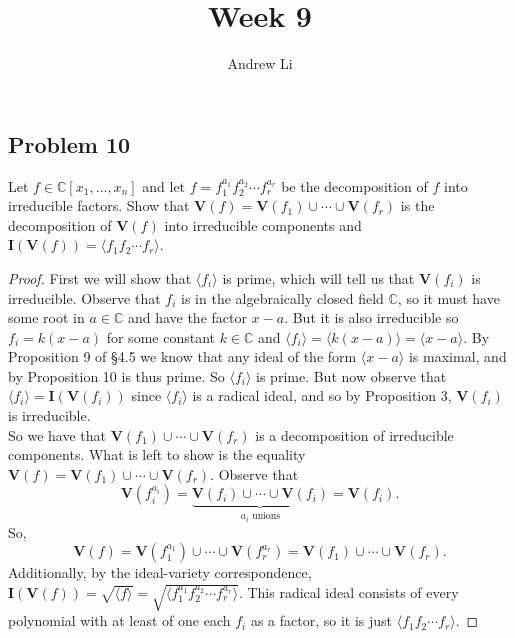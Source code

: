 \documentclass{homework}
\title{Week 9}
\author{Andrew Li}
\newcommand{\cg}[1]{\langle #1 \rangle}
\begin{document}
    \maketitle
    
    \setcounter{section}{4}
    \setcounter{subsection}{5}
    \subsection{Problem 10}
    Let $f \in \mathbb C[x_1, \dots, x_n]$ and let $f = f_1^{a_1}f_2^{a_2} \cdots f_r^{a_r}$ be the decomposition of $f$ into irreducible factors. Show that $\mathbf V(f) = \mathbf V(f_1) \cup \cdots \cup \mathbf V(f_r)$ is the decomposition of $\mathbf V(f)$ into irreducible components and $\mathbf I(\mathbf V(f)) = \cg{f_1f_2\cdots f_r}$.
    
    \begin{proof}
        First we will show that $\cg{f_i}$ is prime, which will tell us that $\mathbf V(f_i)$ is irreducible. Observe that $f_i$ is in the algebraically closed field $\mathbb C$, so it must have some root in $a \in \mathbb C$ and have the factor $x - a$. But it is also irreducible so $f_i = k(x-a)$ for some constant $k \in \mathbb C$ and $\cg{f_i} = \cg{k(x-a)} = \cg{x-a}$. By Proposition 9 of \S4.5 we know that any ideal of the form $\cg{x-a}$ is maximal, and by Proposition 10 is thus prime. So $\cg{f_i}$ is prime. But now observe that $\cg{f_i} = \mathbf I(\mathbf V(f_i))$ since $\cg{f_i}$ is a radical ideal, and so by Proposition 3, $\mathbf V(f_i)$ is irreducible. \\
        
        So we have that $\mathbf V(f_1) \cup \cdots \cup \mathbf V(f_r)$ is a decomposition of irreducible components. What is left to show is the equality $\mathbf V(f) = \mathbf V(f_1) \cup \cdots \cup \mathbf V(f_r)$. Observe that
        \[\mathbf V(f_i^{a_i}) = \underbrace{\mathbf V(f_i) \cup \cdots \cup \mathbf V(f_i)}_{a_i \text{ unions}} = \mathbf V(f_i).\]
        So,
        \[\mathbf V(f) = \mathbf V(f_1^{a_1}) \cup \cdots \cup \mathbf V(f_r^{a_r}) = \mathbf V(f_1) \cup \cdots \cup \mathbf V(f_r).\]
        Additionally, by the ideal-variety correspondence, $\mathbf I(\mathbf V(f)) = \sqrt{\cg{f}} = \sqrt{\cg{f_1^{a_1}f_2^{a_2} \cdots f_r^{a_r}}}$. This radical ideal consists of every polynomial with at least of one each $f_i$ as a factor, so it is just $\cg{f_1f_2 \cdots f_r}$.
    \end{proof}
    
\end{document}
